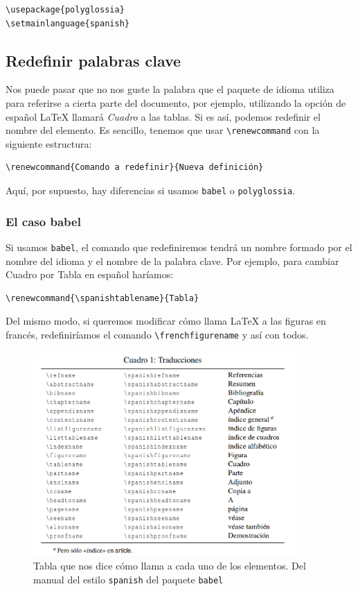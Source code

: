 \begin{lstlisting}[language={[latex]tex}]
\usepackage{polyglossia}
\setmainlanguage{spanish}
\end{lstlisting}

\subsection{Redefinir palabras clave}\label{sec:palabrasClave}

Nos puede pasar que no nos guste la palabra que el paquete de idioma
utiliza para referirse a cierta parte del documento, por ejemplo,
utilizando la opción de español LaTeX llamará \emph{Cuadro} a las tablas. Si es
así, podemos redefinir el nombre del elemento. Es sencillo, tenemos que
usar \lstinline!\renewcommand! con la siguiente estructura:

\begin{lstlisting}[language={[latex]tex}]
\renewcommand{Comando a redefinir}{Nueva definición}
\end{lstlisting}

Aquí, por supuesto, hay diferencias si usamos \lstinline!babel! o \lstinline!polyglossia!.

\subsubsection{El caso babel}

Si usamos \lstinline!babel!, el comando que redefiniremos tendrá un nombre formado
por el nombre del idioma y el nombre de la palabra clave. Por ejemplo,
para cambiar Cuadro por Tabla en español haríamos:

\begin{lstlisting}[language={[latex]tex}]
\renewcommand{\spanishtablename}{Tabla}
\end{lstlisting}

Del mismo modo, si queremos modificar cómo llama LaTeX a las figuras en
francés, redefiniríamos el comando \lstinline!\frenchfigurename! y así con todos.

\begin{figure}[htbp]
\centering
\includegraphics[width=0.9\textwidth]{docs/Figuras/traducciones}
\caption{Tabla que nos dice cómo llama a cada uno de los elementos. Del manual del estilo \lstinline!spanish! del paquete \lstinline!babel!}
\end{figure}

